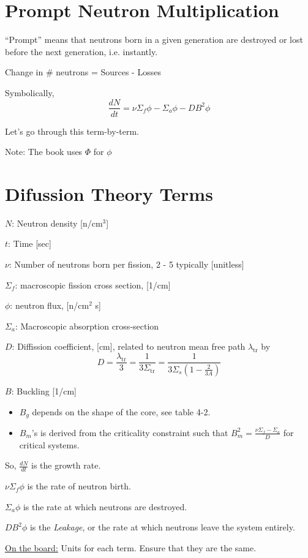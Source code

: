 \section{Prompt Neutron Multiplication}
``Prompt'' means that neutrons born in a given generation are destroyed or lost before the
next generation, i.e. instantly.

Change in \# neutrons = Sources - Losses

Symbolically,
\[ \frac{dN}{dt} = \nu \Sigma_f\phi - \Sigma_a\phi -DB^2\phi \]

Let's go through this term-by-term.

Note: The book uses $\Phi$ for $\phi$

\section{Difussion Theory Terms}
\begin{labeling}
    \item [$N$:] Neutron density [n/cm$^3$]
    \item [$t$:] Time [sec]
    \item [$\nu$:] Number of neutrons born per fission, 2 - 5 typically [unitless]
    \item [$\Sigma_f$:] macroscopic fission cross section, [1/cm]
    \item [$\phi$:] neutron flux, [n/cm$^2$ s]
    \item [$\Sigma_a$:] Macroscopic absorption cross-section
    \item [$D$:] Diffission coefficient, [cm], related to neutron mean free path
        $\lambda_{\mathrm{tr}}$ by
        \[ D = \frac{\lambda_{\mathrm{tr}}}{3} = \frac{1}{3\Sigma_{\mathrm{tr}}} = \frac{1}{3\Sigma_s(1 -\frac{2}{3A})} \]
    \item [$B$:] Buckling [1/cm]
        \begin{itemize}
            \item {} $B_g$ depends on the shape of the core, see table 4-2.
            \item {} $B_m$'s is derived from the criticality constraint
                such that $B_m^2 = \frac{\nu\Sigma_f - \Sigma_a}{D}$ for critical systems.
        \end{itemize}
\end{labeling}

So, $\frac{dN}{dt}$ is the growth rate.

$\nu\Sigma_f\phi$ is the rate of neutron birth.

$\Sigma_a\phi$ is the rate at which neutrons are destroyed.

$DB^2\phi$ is the \textit{Leakage}, or the rate at which neutrons leave the system entirely.

\underline{On the board:}  Units for each term. Ensure that they are the same.
